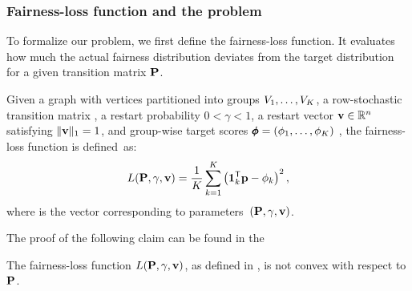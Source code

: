 \documentclass[sigconf, anonymous, review]{acmart}
\begin{document}

\subsubsection{Fairness-loss function and the \phiPageRank problem}
%
To formalize our problem, we first define the fairness-loss function. It evaluates how much the actual fairness distribution deviates from the target distribution for a given transition matrix $\mathbf{{P}}$.


\begin{definition} 
\label{definition:fairloss} 
Given a graph \graph with vertices partitioned into groups $V_1, \ldots, V_K$, a row-stochastic transition matrix \transmatrix, a restart probability $0 < \gamma < 1$, a restart vector $\mathbf{{v}} \in \mathbb{R}^{n}$ satisfying $\|\mathbf{{v}}\|_1 = 1$, and group-wise target \pagerank scores $\pmb{\phi} = (\phi_1, \ldots, \phi_K)$ , the {fairness-loss function} is defined~as: 
\begin{equation} 
L(\mathbf{{P}}, \gamma, \mathbf{{v}}) = \frac{1}{K} \sum_{k=1}^K \left(\mathbf{{1}}_{k}^{\mathsf{T}} \mathbf{{p}} - \phi_k\right)^2, 
\label{eq:loss_function} 
\end{equation} 
where \prvector is the \pagerank vector corresponding to parameters~$(\mathbf{{P}}, \gamma, \mathbf{{v}})$. \end{definition}

The proof of the following claim can be found in the 

\begin{prop}
\label{proposition:non-convexity}
The fairness-loss function $L(\mathbf{{P}}, \gamma, \mathbf{{v}})$, 
as defined in , is not convex with respect to $\mathbf{{P}}$.
\end{prop}
\end{document}

